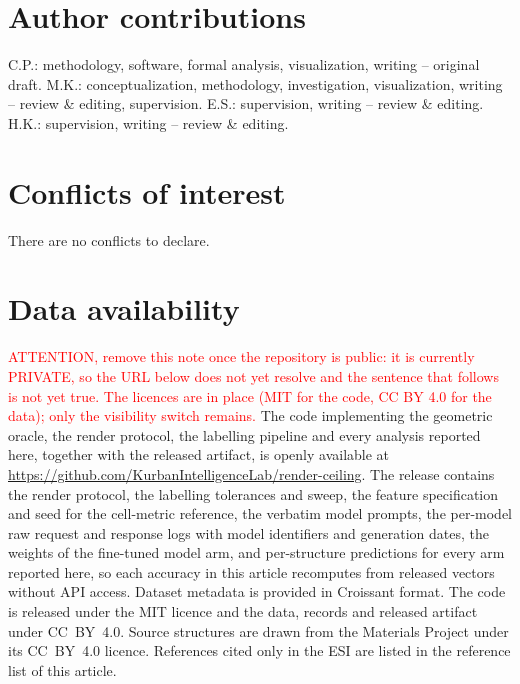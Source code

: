 \documentclass[twoside,twocolumn,9pt]{article}
\begin{document}







\section*{Author contributions}
C.P.: methodology, software, formal analysis, visualization, writing -- original draft. M.K.: conceptualization, methodology, investigation, visualization, writing -- review \& editing, supervision. E.S.: supervision, writing -- review \& editing. H.K.: supervision, writing -- review \& editing.

\section*{Conflicts of interest}
There are no conflicts to declare.

\section*{Data availability}
\textcolor{red}{ATTENTION, remove this note once the repository is public: it is currently PRIVATE, so the
URL below does not yet resolve and the sentence that follows is not yet true. The licences are in place
(MIT for the code, CC BY 4.0 for the data); only the visibility switch remains.}
The code implementing the geometric oracle, the render protocol, the labelling pipeline and every analysis
reported here, together with the released artifact, is openly available at
\url{https://github.com/KurbanIntelligenceLab/render-ceiling}. The release contains the render protocol, the
labelling tolerances and sweep, the feature specification and seed for the cell-metric reference, the
verbatim model prompts, the per-model raw request and response logs with model identifiers and generation
dates, the weights of the fine-tuned model arm, and per-structure predictions for every arm reported here, so
each accuracy in this article recomputes from released vectors without API access. Dataset metadata is
provided in Croissant format. The code is released under the MIT licence and the data, records and
released artifact under CC~BY~4.0. Source structures are drawn from the Materials Project under its
CC~BY~4.0 licence. References cited only in the ESI\dag{} are listed in the reference list of this article.
\end{document}
